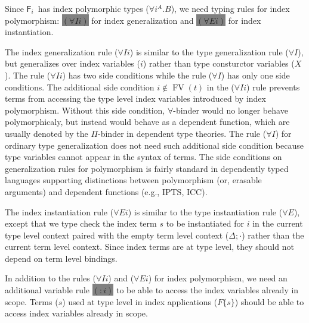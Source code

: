 \documentclass{llncs}
\newcommand{\newFi}[1]{\colorbox{grey}{\ensuremath{#1}}}
\newcommand{\eg}{{e.g.}}
\newcommand{\Fi}{\ensuremath{\mathsf{F}_i}}
\newcommand{\FV}{\mathop{\mathrm{FV}}}
\begin{document}
Since \Fi\ has index polymorphic types ($\forall i^A . B$),
we need typing rules for index polymorphism:
\newFi{(\forall I i)} for index generalization
and \newFi{(\forall E i)} for index instantiation.

The index generalization rule ($\forall I i$) is similar to
the type generalization rule ($\forall I$), but generalizes over
index variables ($i$) rather than type consturctor variables ($X$).
The rule ($\forall I i$) has two side conditions
while the rule ($\forall I$) has only one side conditions.
The additional side condition $i\notin\FV(t)$ in the ($\forall I i$) rule
prevents terms from accessing the type level index variables introduced by
index polymorphism. Without this side condition, $\forall$-binder
would no longer behave polymorphicaly, but instead would behave as
a dependent function, which are usually denoted by the $\Pi$-binder in
dependent type theories. The rule ($\forall I$) for ordinary
type generalization does not need such additional side condition
because type variables cannot appear in the syntax of terms.
The side conditions on generalization rules for polymorphism is fairly standard
in dependently typed languages supporting distinctions between polymorphism
(or, erasable arguments) and dependent functions (\eg, IPTS\cite{LingerS08},
ICC\cite{Miquel01}).

The index instantiation rule ($\forall E i$) is similar to
the type instantiation rule ($\forall E$), except that
we type check the index term $s$ to be instantiated for $i$
in the current type level context paired with the empty term level context
($\Delta;\cdot$) rather than the current term level context.
Since index terms are at type level, they should not depend on
term level bindings.

In addition to the rules ($\forall I i$) and ($\forall E i$) for
index polymorphism, we need an additional variable rule \newFi{(:i)}
to be able to access the index variables already in scope. Terms ($s$) used
at type level in index applications ($F\{s\}$) should be able to access
index variables already in scope. 
\end{document}
